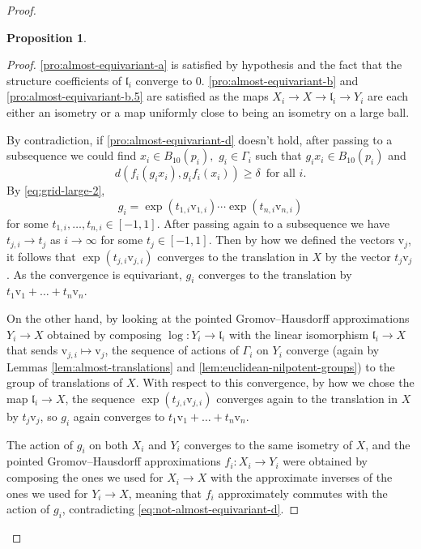 \documentclass[12pt]{amsart}
\theoremstyle{definition}
\def\fnum{equation}
\newtheorem{proposition}[\fnum]{Proposition}
\numberwithin{equation}{section}
\newcommand{\vv}{\text{v}}
\begin{document}
\begin{proof}
\begin{proposition}
\end{proposition}

\begin{proof}
 \eqref{pro:almost-equivariant-a} is satisfied by hypothesis and the fact that the structure coefficients of $\mathfrak{l}_i$ converge to 0.  \eqref{pro:almost-equivariant-b} and \eqref{pro:almost-equivariant-b.5}  are satisfied as the maps $X_i \to X \to \mathfrak{l}_i \to Y_i$ are each either an isometry or a map uniformly close to being an isometry on a large ball. 

By contradiction, if  \eqref{pro:almost-equivariant-d} doesn't hold, after passing to a subsequence we could find $x_i \in B_{10}(p_i), $ $g_i \in \Gamma_i$ such that $g_i x_i \in B_{10}(p_i)$ and 
\begin{equation}\label{eq:not-almost-equivariant-d}
        d(  f_i (g_i x_i ) , g_i f_i (x_i) ) \geq \delta \, \text{ for all } i.      
\end{equation}
By  \eqref{eq:grid-large-2}, 
\[     g _i   = \exp ( t_{1,i} \vv_{1,i} ) \cdots \exp ( t_{n,i} \vv_{n,i}  )              \]
for some $t_{1,i}, \ldots , t_{n,i} \in [ -1 , 1 ] $.  After passing again to a subsequence  we have $t_{j,i} \to t_j$ as $i \to \infty$ for some $t_j \in [-1,1]$. Then by how we defined the vectors $\vv_j$, it follows that $\exp ( t_{j,i} \vv _ {j,i})$ converges to the translation in $X$ by the vector $t_j \vv_j$. As the convergence is equivariant, $g_i$ converges to the translation by $ t_1 \vv _ 1 + \ldots + t_n \vv_n$. 

On the other hand, by looking at the pointed Gromov--Hausdorff approximations $Y_i \to X$ obtained by composing $\log : Y_i \to \mathfrak{l}_i$ with the linear isomorphism $\mathfrak{l}_i \to X$ that sends $\vv_{j,i} \mapsto \vv_j$, the sequence of actions of $\Gamma _i $ on $Y_i$ converge (again by Lemmas \ref{lem:almost-translations} and \ref{lem:euclidean-nilpotent-groups}) to the group of translations of $X$. With respect to this convergence, by how we chose the map $\mathfrak{l}_i \to X$, the sequence $\exp (t_{j,i}\vv_{j,i})$ converges again to the translation in $X$ by $t_j \vv_j$, so $g_i$ again converges to $t_1\vv_1 + \ldots + t_n \vv_n $. 

The action of $g_i$ on both $X_i$ and $Y_i$ converges to the same isometry of $X$, and the pointed Gromov--Hausdorff approximations $f_i : X_i \to Y_i $ were obtained by composing the ones we used for $X_i \to X$ with the approximate inverses of the ones we used for $Y_i \to X$, meaning that $f_i$ approximately commutes with the action of $g_i$, contradicting  \eqref{eq:not-almost-equivariant-d}.


\end{proof}
\end{proof}
\end{document}
